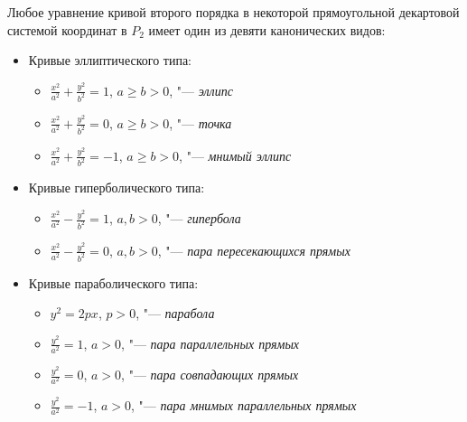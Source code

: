 \begin{theorem}
	Любое уравнение кривой второго порядка в некоторой прямоугольной декартовой системой координат в $P_2$ имеет один из девяти канонических видов:
	\begin{itemize}
		\item Кривые эллиптического типа:
		\begin{itemize}
			\item $\frac{x^2}{a^2} + \frac{y^2}{b^2} = 1$, $a \ge b > 0$, "--- \textit{эллипс}
			\item $\frac{x^2}{a^2} + \frac{y^2}{b^2} = 0$, $a \ge b > 0$, "--- \textit{точка}
			\item $\frac{x^2}{a^2} + \frac{y^2}{b^2} = -1$, $a \ge b > 0$, "--- \textit{мнимый эллипс}
		\end{itemize}
	
		\item Кривые гиперболического типа:
		\begin{itemize}
			\item $\frac{x^2}{a^2} - \frac{y^2}{b^2} = 1$, $a, b > 0$, "--- \textit{гипербола}
			\item $\frac{x^2}{a^2} - \frac{y^2}{b^2} = 0$, $a, b > 0$, "--- \textit{пара пересекающихся прямых}
		\end{itemize}
	
		\item Кривые параболического типа:
		\begin{itemize}
			\item $y^2 = 2px$, $p > 0$, "--- \textit{парабола}
			\item $\frac{y^2}{a^2} = 1$, $a > 0$, "--- \textit{пара параллельных прямых}
			\item $\frac{y^2}{a^2} = 0$, $a > 0$, "--- \textit{пара совпадающих прямых}
			\item $\frac{y^2}{a^2} = -1$, $a > 0$, "--- \textit{пара мнимых параллельных прямых}
		\end{itemize}
	\end{itemize}
\end{theorem}

